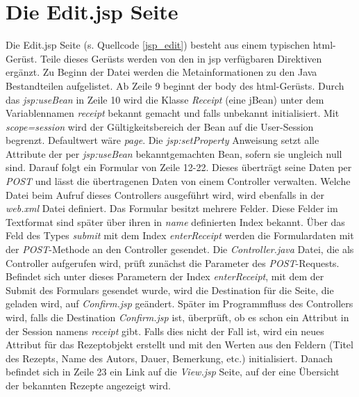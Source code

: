\section{Die Edit.jsp Seite}
Die Edit.jsp Seite (s. Quellcode \ref{jsp_edit}) besteht aus einem typischen \acrshort{html}-Gerüst. Teile dieses Gerüsts werden von den in \acrshort{jsp} verfügbaren Direktiven ergänzt. Zu Beginn der Datei werden die Metainformationen zu den Java Bestandteilen aufgelistet.
Ab Zeile 9 beginnt der body des \acrshort{html}-Gerüsts. Durch das \textit{jsp:useBean} in Zeile 10 wird die Klasse \textit{Receipt} (eine jBean) unter dem Variablennamen \textit{receipt} bekannt gemacht und falls unbekannt initialisiert. Mit \textit{scope=\glqq session\grqq} wird der Gültigkeitsbereich der Bean auf die User-Session begrenzt. Defaultwert wäre \textit{page}.
Die \textit{jsp:setProperty} Anweisung setzt alle Attribute der per \textit{jsp:useBean} bekanntgemachten Bean, sofern sie ungleich null sind.  
Darauf folgt ein Formular von Zeile 12-22. Dieses überträgt seine Daten per \textit{POST} und lässt die übertragenen Daten von einem Controller verwalten. Welche Datei beim Aufruf dieses Controllers ausgeführt wird, wird ebenfalls in der \textit{web.xml} Datei definiert.
Das Formular besitzt mehrere Felder. Diese Felder im Textformat sind später über ihren in \textit{name} definierten Index bekannt. Über das Feld des Types \textit{submit} mit dem Index \textit{enterReceipt} werden die Formulardaten mit der \textit{POST}-Methode an den Controller gesendet. Die \textit{Controller.java} Datei, die als Controller aufgerufen wird, prüft zunächst die Parameter des \textit{POST}-Requests. Befindet sich unter dieses Parametern der Index \textit{enterReceipt}, mit dem der Submit des Formulars gesendet wurde, wird die Destination für die Seite, die geladen wird, auf \textit{Confirm.jsp} geändert. Später im Programmfluss des Controllers wird, falls die Destination \textit{Confirm.jsp} ist, überprüft, ob es schon ein Attribut in der Session namens \textit{receipt} gibt. Falls dies nicht der Fall ist, wird ein neues Attribut für das Rezeptobjekt erstellt und mit den Werten aus den Feldern (Titel des Rezepts, Name des Autors, Dauer, Bemerkung, etc.) initialisiert.
Danach befindet sich in Zeile 23 ein Link auf die \textit{View.jsp} Seite, auf der eine Übersicht der bekannten Rezepte angezeigt wird.
